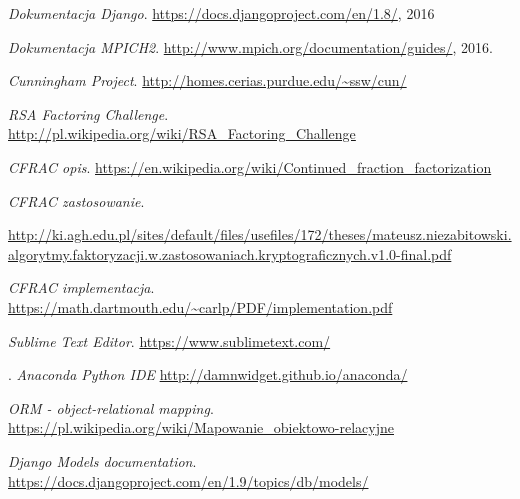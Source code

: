 \documentclass{article}
\begin{document}
\newpage
\begin{thebibliography}{9}
	\emph{Dokumentacja Django}.
	\url{https://docs.djangoproject.com/en/1.8/},
	2016

	\emph{Dokumentacja MPICH2}.
  	\url{http://www.mpich.org/documentation/guides/},
  	2016.

	\emph{Cunningham Project}.
	\url{http://homes.cerias.purdue.edu/~ssw/cun/}

	\emph{RSA Factoring Challenge}.
	\url{http://pl.wikipedia.org/wiki/RSA_Factoring_Challenge}
	
	\emph{CFRAC opis}.
	\url{https://en.wikipedia.org/wiki/Continued_fraction_factorization}

	\emph{CFRAC zastosowanie}.
	\author{Mateusz Niezabitowski}
    \url{http://ki.agh.edu.pl/sites/default/files/usefiles/172/theses/mateusz.niezabitowski.algorytmy.faktoryzacji.w.zastosowaniach.kryptograficznych.v1.0-final.pdf}
    
	\emph{CFRAC implementacja}.
    \url{https://math.dartmouth.edu/~carlp/PDF/implementation.pdf}

  \emph{Sublime Text Editor}.
  \url{https://www.sublimetext.com/}

.
  \emph{Anaconda Python IDE}
  \url{http://damnwidget.github.io/anaconda/}

  \emph{ORM - object-relational mapping}.
  \url{https://pl.wikipedia.org/wiki/Mapowanie_obiektowo-relacyjne}

  \emph{Django Models documentation}.
  \url{https://docs.djangoproject.com/en/1.9/topics/db/models/}

\end{thebibliography}
\end{document}
